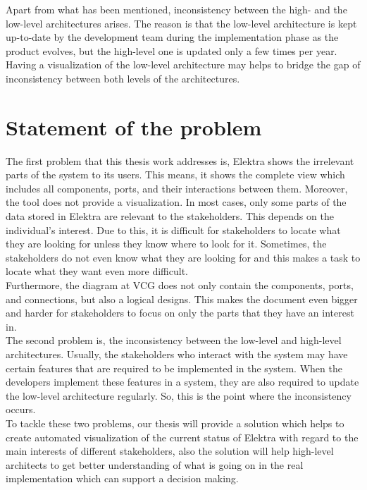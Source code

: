 Apart from what has been mentioned, inconsistency between the high- and the low-level architectures arises. The reason is that the low-level architecture is kept up-to-date by the development team during the implementation phase as the product evolves, but the high-level one is updated only a few times per year. Having a visualization of the low-level architecture may helps to bridge the gap of inconsistency between both levels of the architectures.


\section{Statement of the problem} \label{Statement_ref}
The first problem that this thesis work addresses is, Elektra shows the irrelevant parts of the system to its users. This means, it shows the complete view which includes all components, ports, and their interactions between them. Moreover, the tool does not provide a visualization. In most cases, only some parts of the data stored in Elektra are relevant to the stakeholders. This depends on the individual’s interest. Due to this, it is difficult for stakeholders to locate what they are looking for unless they know where to look for it. Sometimes, the stakeholders do not even know what they are looking for and this makes a task to locate what they want even more difficult. \\

Furthermore, the diagram at VCG does not only contain the components, ports, and connections, but also a logical designs. This makes the document even bigger and harder for stakeholders to focus on only the parts that they have an interest in. \\ 

The second problem is, the inconsistency between the low-level and high-level architectures. Usually, the stakeholders who interact with the system may have certain features that are required to be implemented in the system. When the developers implement these features in a system, they are also required to update the low-level architecture regularly. So, this is the point where the inconsistency occurs. \\ 

To tackle these two problems, our thesis will provide a solution which helps to create automated visualization of the current status of Elektra with regard to the main interests of different stakeholders, also the solution will help high-level architects to get better understanding of what is going on in the real implementation which can support a decision making.


